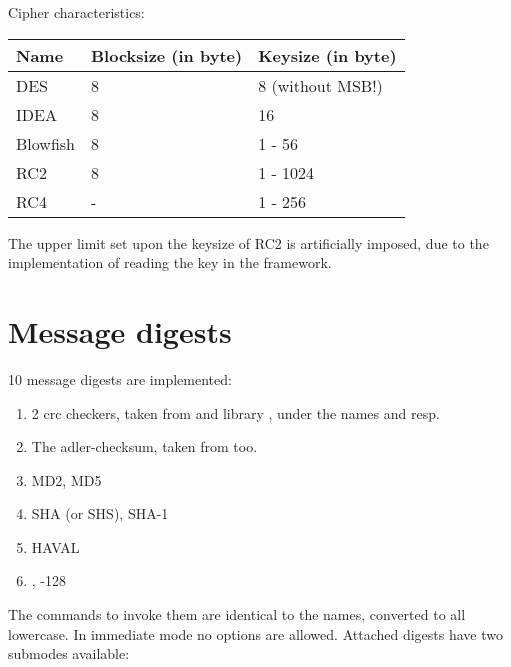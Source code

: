 \documentclass {report}
\begin{document}
Cipher characteristics:

\begin {center}
	\begin {tabular}{|l|l|l|}\hline
	Name		& Blocksize (in byte)	& Keysize (in byte) \\ \hline\hline
	DES		& 8			& 8 (without MSB!) \\ \hline
	IDEA		& 8			& 16 \\ \hline
	Blowfish	& 8			& 1 - 56 \\ \hline
	RC2		& 8			& 1 - 1024 \\ \hline\hline
	RC4		& -			& 1 - 256 \\ \hline
	\end   {tabular}
\end   {center}

The upper limit set upon the keysize of RC2 is artificially imposed,
due to the implementation of reading the key in the framework.


\section {Message digests}

10 message digests are implemented:

\begin {enumerate}
\item	2 crc checkers, taken from \PGP{} and library \zlib, under
	the names  and  resp.
\item	The adler-checksum, taken from \zlib{} too.
\item	MD2, MD5
\item	SHA (or SHS), SHA-1
\item	HAVAL
\item	\rmd, -128
\end   {enumerate}

The commands to invoke them are identical to the names, converted to
all lowercase. In immediate mode no options are allowed. Attached
digests have two submodes available:
\end{document}
